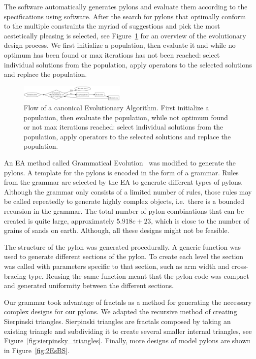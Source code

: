 \documentclass{sig-alternate}
\begin{document}
The software automatically generates pylons and evaluate them
according to the specifications using software. After the search for
pylons that optimally conform to the multiple constraints the myriad
of suggestions and pick the most aestetically pleasing is selected,
see Figure~\ref{fig:EA_general} for an overview of the evolutionary
design process. We first initialize a population, then evaluate it and
while no optimum has been found or max iterations has not been
reached: select individual solutions from the population, apply
operators to the selected solutions and replace the population.

\begin{figure}
\centering
  \includegraphics[width=0.46\textwidth]{images/EA_general}
  \caption{Flow of a canonical Evolutionary Algorithm. First
    initialize a population, then evaluate the population, while not
    optimum found or not max iterations reached: select individual
    solutions from the population, apply operators to the selected
    solutions and replace the population.}
  \label{fig:EA_general}
\end{figure}

An EA method called Grammatical Evolution~\cite{oneill2010} was
modified to generate the pylons. A template for the pylons is encoded
in the form of a grammar. Rules from the grammar are selected by the
EA to generate different types of pylons. Although the grammar only
consists of a limited number of rules, those rules may be called
repeatedly to generate highly complex objects, i.e.~there is a bounded
recursion in the grammar. The total number of pylon combinations that
can be created is quite large, approximately $5.918e+23$, which is
close to the number of grains of sands on earth. Although, all these
designs might not be feasible.

The structure of the pylon was generated procedurally. A generic
function was used to generate different sections of the pylon. To
create each level the section was called with parameters specific to
that section, such as arm width and cross-bracing type. Reusing the
same function meant that the pylon code was compact and generated
uniformity between the different sections.

Our grammar took advantage of fractals as a method for generating the
necessary complex designs for our pylons. We adapted the recursive
method of creating Sierpinski triangles. Sierpinski triangles are
fractals composed by taking an existing triangle and subdividing it to
create several smaller internal triangles, see
Figure~\ref{fig:sierpinsky_triangles}. Finally, more designs of model
pylons are shown in Figure~\ref{fig:2EsBS}.
\end{document}
